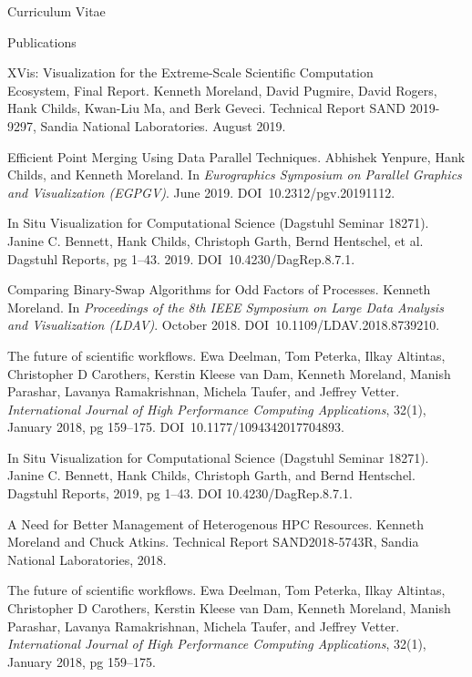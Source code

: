 \documentclass{article}
\begin{document}
\begin{cv}{Curriculum Vitae}
    \begin{cvlist}{Publications}
    \item[XVis: Visualization for the Extreme-Scale Scientific Computation]~\\ Ecosystem, Final Report.
      Kenneth Moreland, David Pugmire, David Rogers, Hank Childs, Kwan-Liu Ma, and Berk Geveci.
      Technical Report SAND 2019-9297, Sandia National Laboratories.
      August 2019.
    \item[Efficient Point Merging Using Data Parallel Techniques.]
      Abhishek Yenpure, Hank Childs, and Kenneth Moreland.
      In \emph{Eurographics Symposium on Parallel Graphics and Visualization (EGPGV)}.
      June 2019.
      DOI~10.2312/pgv.20191112.
    \item[In Situ Visualization for Computational Science (Dagstuhl Seminar 18271).]
      Janine C. Bennett, Hank Childs, Christoph Garth, Bernd Hentschel, et al.
      Dagstuhl Reports, pg 1--43.
      2019.
      DOI~10.4230/DagRep.8.7.1.
    \item[Comparing Binary-Swap Algorithms for Odd Factors of Processes.]
      Kenneth Moreland.
      In \emph{Proceedings of the 8th IEEE Symposium on Large Data Analysis and Visualization (LDAV)}.
      October 2018.
      DOI~10.1109/LDAV.2018.8739210.
    \item[The future of scientific workflows.]
      Ewa Deelman, Tom Peterka, Ilkay Altintas, Christopher D Carothers, Kerstin Kleese van Dam, Kenneth Moreland, Manish Parashar, Lavanya Ramakrishnan, Michela Taufer, and Jeffrey Vetter.
      \emph{International Journal of High Performance Computing Applications}, 32(1), January 2018, pg 159--175.
      DOI~10.1177/1094342017704893.
    \item[In Situ Visualization for Computational Science]
      (Dagstuhl Seminar 18271).
      Janine C. Bennett, Hank Childs, Christoph Garth, and Bernd Hentschel.
      Dagstuhl Reports, 2019, pg 1--43. DOI 10.4230/DagRep.8.7.1.
    \item[A Need for Better Management of Heterogenous HPC Resources.]
      Kenneth Moreland and Chuck Atkins.
      Technical Report SAND2018-5743R, Sandia National Laboratories, 2018.
    \item[The future of scientific workflows.]
      Ewa Deelman, Tom Peterka, Ilkay Altintas, Christopher D Carothers, Kerstin Kleese van Dam, Kenneth Moreland, Manish Parashar, Lavanya Ramakrishnan, Michela Taufer, and Jeffrey Vetter.
      \emph{International Journal of High Performance Computing Applications}, 32(1), January 2018, pg 159--175.

\end{cvlist}
\end{cv}
\end{document}
